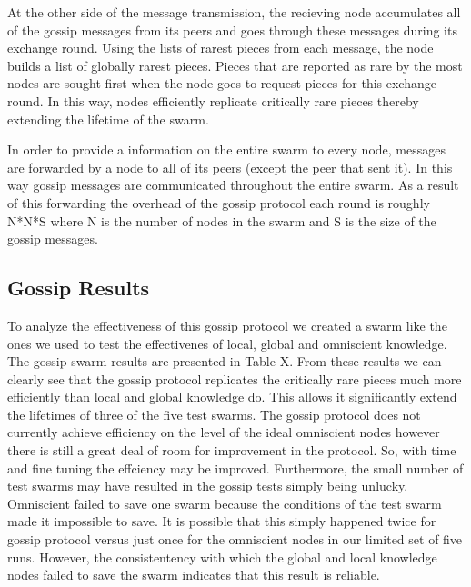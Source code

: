 At the other side of the message transmission, the recieving node
accumulates all of the gossip messages from its peers and goes
through these messages during its exchange round. Using the lists of
rarest pieces from each message, the node builds a list of globally
rarest pieces. Pieces that are reported as rare by the most nodes are
sought first when the node goes to request pieces for this exchange
round. In this way, nodes efficiently replicate critically rare pieces
thereby extending the lifetime of the swarm. 

In order to provide a information on the entire swarm to every node,
messages are forwarded by a node to all of its peers (except the peer
that sent it). In this way gossip messages are communicated throughout
the entire swarm. As a result of this forwarding the overhead of the
gossip protocol each round is roughly N*N*S where N is the number of
nodes in the swarm and S is the size of the gossip messages.

\subsection{Gossip Results}

To analyze the effectiveness of this gossip protocol we created a
swarm like the ones we used to test the effectivenes of local, global
and omniscient knowledge. The gossip swarm results are presented in
Table X. From these results we can clearly see that the gossip
protocol replicates the critically rare pieces much more efficiently
than local and global knowledge do. This allows it significantly extend the
lifetimes of three of the five test swarms. The gossip protocol does
not currently achieve efficiency on the level of the ideal omniscient
nodes however there is still a great deal of room for improvement
in the protocol. So, with time and fine tuning the effciency may be
improved. Furthermore, the small number of test swarms may have
resulted in the gossip tests simply being unlucky. Omniscient failed
to save one swarm because the conditions of the test swarm made it
impossible to save. It is possible that this simply happened twice for
gossip protocol versus just once for the omniscient nodes in our
limited set of five runs. However, the consistentency with which the
global and local knowledge nodes failed to save the swarm indicates
that this result is reliable.

%

